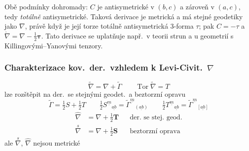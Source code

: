 \begin{vysvetleni}
Obě podmínky dohromady: $C$ je antisymetrické v $(b,c)$ a zároveň v $(a,c)$, tedy \emph{totálně} antisymetrické. Taková derivace je metrická a má stejné geodetiky jako $\nabla$, právě když je její torze totálně antisymetrická 3-forma $\tau$; pak $C=-\tau$ a $\mathring\nabla=\nabla-\tfrac12\boldsymbol\tau$. Tato derivace se uplatňuje např.\ v teorii strun a u geometrií s Killingovými--Yanovými tenzory.
\end{vysvetleni}

\subsubsection*{Charakterizace kov.\ der.\ vzhledem k Levi-Civit.\ $\nabla$}

\begin{minipage}{0.58\textwidth}
\[ \tilde\nabla = \nabla + \tilde\Gamma \qquad \operatorname{Tor}\tilde\nabla = T \]
lze rozštěpit na der.\ se stejnými geodet.\ a beztorzní opravu
\[
  \tilde\Gamma = \tfrac12 S + \tfrac12 T \qquad \tfrac12 S^{\underline{m}}{}_{\underline{ab}} = \tilde\Gamma^{\underline{m}}{}_{(\underline{ab})} \qquad \tfrac12 T^{\underline{m}}{}_{\underline{ab}} = \tilde\Gamma^{\underline{m}}{}_{[\underline{ab}]}
\]
\begin{align*}
  \hat\nabla &= \nabla + \tfrac12\mathbf{T} && \text{der.\ se stej.\ geod.} \\
  \overset{s}{\nabla} &= \nabla + \tfrac12\mathbf{S} && \text{beztorzní oprava}
\end{align*}
ale $\overset{s}{\nabla}$, $\hat\nabla$ nejsou metrické
\end{minipage}
\hfill
\begin{minipage}{0.4\textwidth}
\end{minipage}

